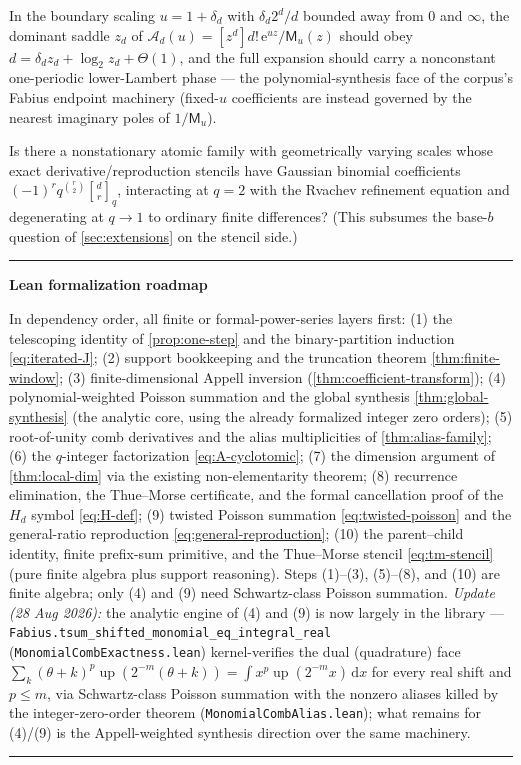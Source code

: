 \documentclass[11pt,oneside]{article}
\numberwithin{equation}{section}
\theoremstyle{definition}
\theoremstyle{remark}
\newcommand{\dd}{\,\mathrm d}
\newcommand{\e}{\mathrm e}
\newcommand{\Up}{\operatorname{up}}
\newcommand{\MM}{\mathsf M}
\newcommand{\Gd}{\mathcal A}
\newenvironment{statusbox}[1]{%
  \par\smallskip\noindent\begin{center}\begin{minipage}{0.94\textwidth}%
  \hrule\vspace{0.5em}\noindent\textbf{#1}\par\smallskip
}{%
  \vspace{0.5em}\hrule\end{minipage}\end{center}\smallskip
}
\begin{document}
\begin{question}
\label{q:appell-endpoint}
In the boundary scaling $u=1+\delta_d$ with
$\delta_d2^{d}/d$ bounded away from $0$ and $\infty$, the dominant
saddle $z_d$ of $\Gd_d(u)=[z^{d}]d!\,\e^{uz}/\MM_u(z)$ should obey
$d=\delta_dz_d+\log_2z_d+\Theta(1)$, and the full expansion should
carry a nonconstant one-periodic lower-Lambert phase --- the
polynomial-synthesis face of the corpus's Fabius endpoint machinery
(fixed-$u$ coefficients are instead governed by the nearest
imaginary poles of $1/\MM_u$).
\end{question}

\begin{question}
\label{q:qgeometric}
Is there a nonstationary atomic family with geometrically varying
scales whose exact derivative/reproduction stencils have Gaussian
binomial coefficients $(-1)^{r}q^{\binom r2}
\genfrac{[}{]}{0pt}{}{d}{r}_q$, interacting at $q=2$ with the
Rvachev refinement equation and degenerating at $q\to1$ to ordinary
finite differences?  (This subsumes the base-$b$ question of
\cref{sec:extensions} on the stencil side.)
\end{question}

\begin{statusbox}{Lean formalization roadmap}
In dependency order, all finite or formal-power-series layers first:
(1) the telescoping identity of \cref{prop:one-step} and the
binary-partition induction \eqref{eq:iterated-J};
(2) support bookkeeping and the truncation theorem
\cref{thm:finite-window}; (3) finite-dimensional Appell inversion
(\cref{thm:coefficient-transform});
(4) polynomial-weighted Poisson summation and the global synthesis
\cref{thm:global-synthesis} (the analytic core, using the already
formalized integer zero orders);
(5) root-of-unity comb derivatives and the alias multiplicities of
\cref{thm:alias-family}; (6) the $q$-integer factorization
\eqref{eq:A-cyclotomic}; (7) the dimension argument of
\cref{thm:local-dim} via the existing non-elementarity theorem;
(8) recurrence elimination, the Thue--Morse certificate, and the
formal cancellation proof of the $H_d$ symbol
\eqref{eq:H-def}; (9) twisted Poisson summation
\eqref{eq:twisted-poisson} and the general-ratio reproduction
\eqref{eq:general-reproduction}; (10) the parent--child identity,
finite prefix-sum primitive, and the Thue--Morse stencil
\eqref{eq:tm-stencil} (pure finite algebra plus support
reasoning).  Steps (1)--(3), (5)--(8), and (10) are finite
algebra; only (4) and (9) need Schwartz-class Poisson summation.
\emph{Update (28 Aug 2026):} the analytic engine of (4) and (9) is
now largely in the library ---
\nolinkurl{Fabius.tsum_shifted_monomial_eq_integral_real}
(\nolinkurl{MonomialCombExactness.lean}) kernel-verifies the dual
(quadrature) face
$\sum_{k}(\theta+k)^{p}\Up(2^{-m}(\theta+k))
=\int x^{p}\Up(2^{-m}x)\dd x$ for every real shift and $p\le m$,
via Schwartz-class Poisson summation with the nonzero aliases killed
by the integer-zero-order theorem
(\nolinkurl{MonomialCombAlias.lean}); what remains for (4)/(9) is
the Appell-weighted synthesis direction over the same machinery.
\end{statusbox}
\end{document}
